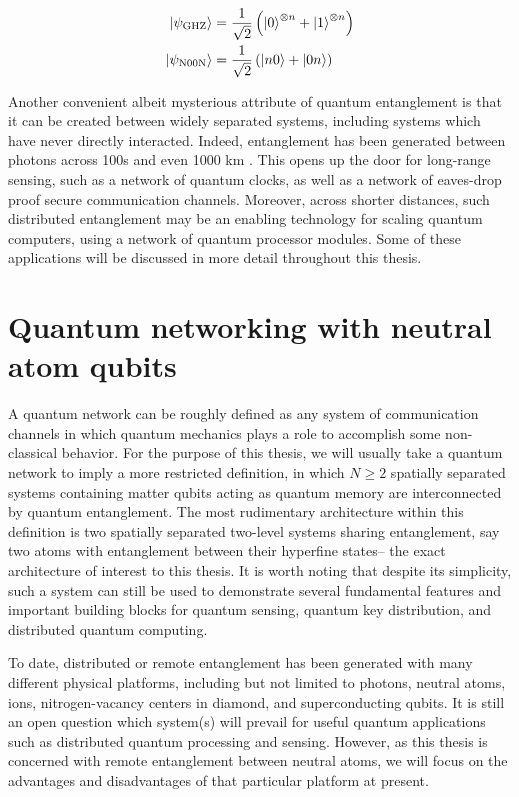 \begin{align}
    \ket{\psi_{\text{GHZ}}} &= \frac{1}{\sqrt{2}} \left(\ket{0}^{\otimes n} + \ket{1}^{\otimes n}\right) \\
    \ket{\psi_{\text{N00N}}} &= \frac{1}{\sqrt{2}} \left( \ket{n0} + \ket{0n} \right)
\end{align}
    
Another convenient albeit mysterious attribute of quantum entanglement is that it can be created between widely separated systems, including systems which have never directly interacted. Indeed, entanglement has been generated between photons across 100s and even 1000 km \cite{Neumann2022, Yin2020}. This opens up the door for long-range sensing, such as a network of quantum clocks\cite{Kómár2014}, as well as a network of eaves-drop proof secure communication channels. Moreover, across shorter distances, such distributed entanglement may be an enabling technology for scaling quantum computers, using a network of quantum processor modules\cite{Monroe2014modular}. Some of these applications will be discussed in more detail throughout this thesis.

\section{Quantum networking with neutral atom qubits}

A quantum network can be roughly defined as any system of communication channels in which quantum mechanics plays a role to accomplish some non-classical behavior. For the purpose of this thesis, we will usually take a quantum network to imply a more restricted definition, in which $N\geq2$ spatially separated systems containing matter qubits acting as quantum memory are interconnected by quantum entanglement. The most rudimentary architecture within this definition is two spatially separated two-level systems sharing entanglement, say two atoms with entanglement between their hyperfine states-- the exact architecture of interest to this thesis. It is worth noting that despite its simplicity, such a system can still be used to demonstrate several fundamental features and important building blocks for quantum sensing, quantum key distribution, and distributed quantum computing\cite{main2024, drmota2024, Langenfeld2021}.

To date, distributed or remote entanglement has been generated with many different physical platforms, including but not limited to photons, neutral atoms, ions, nitrogen-vacancy centers in diamond, and superconducting qubits. It is still an open question which system(s) will prevail for useful quantum applications such as distributed quantum processing and sensing. However, as this thesis is concerned with remote entanglement between neutral atoms, we will focus on the advantages and disadvantages of that particular platform at present.

